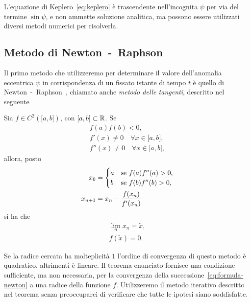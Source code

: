 L'equazione di Keplero~\eqref{eq:keplero} è trascendente nell'incognita $\psi$
per via del termine $\sin\psi$, e non ammette soluzione analitica, ma possono
essere utilizzati diversi metodi numerici per risolverla.

\subsection{Metodo di Newton~-~Raphson}
\label{sec:newton}

Il primo metodo che utilizzeremo per determinare il valore dell'anomalia
eccentrica $\psi$ in corrispondenza di un fissato istante di tempo $t$ è quello
di Newton~-~Raphson~\cite[30]{brugnano:calcolo-numerico}, chiamato anche
\emph{metodo delle tangenti}, descritto nel seguente
\begin{teorema}
  Sia $f\in C^2(\mathopen{[}a,b\mathclose{]})$, con
  $\mathopen{[}a,b\mathclose{]}\subset\mathbb{R}$. Se
  \begin{subequations}
    \begin{gather}
      f(a)f(b) <0, \label{eq:esistenza-zero}\\
      f'(x) \neq 0 \quad \forall x \in \mathopen{[}a,b\mathclose{]},\\
      f''(x) \neq 0 \quad \forall x \in \mathopen{[}a,b\mathclose{]},
    \end{gather}
  \end{subequations}
  allora, posto
  \begin{subequations}
    \begin{align}
      x_0 &=
      \begin{cases}
        a & \text{se $ f(a)f''(a)>0$,}\\
        b & \text{se $f(b)f''(b)>0$,}
      \end{cases}\\
      x_{n+1} &= x_n - \frac{f(x_n)}{f'(x_n)} \label{eq:formula-newton}
    \end{align}
  \end{subequations}
  si ha che
  \begin{subequations}
    \begin{gather}
      \lim_n x_n = \tilde{x},\\
      f(\tilde{x}) = 0.
    \end{gather}
  \end{subequations}
\end{teorema}
Se la radice cercata ha molteplicità $1$ l'ordine di convergenza di questo
metodo è quadratico, altrimenti è lineare. Il teorema enunciato fornisce una
condizione sufficiente, ma non necessaria, per la convergenza della
successione~\eqref{eq:formula-newton} a una radice della funzione
$f$. Utilizzeremo il metodo iterativo descritto nel teorema senza preoccuparci
di verificare che tutte le ipotesi siano soddisfatte.

